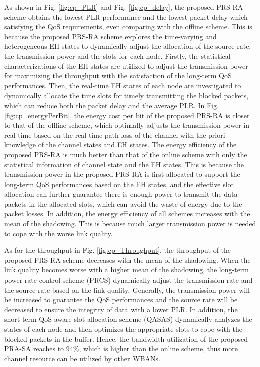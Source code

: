 \documentclass[journal,10pt]{IEEEtran}
\begin{document}
As shown in Fig. \ref{fig:cp_PLR} and Fig. \ref{fig:cp_delay}, the proposed PRS-RA scheme obtains the lowest PLR performance and the lowest packet delay which satisfying the QoS requirements, even comparing with the offline scheme. 
This is because the proposed PRS-RA scheme explores the time-varying and heterogeneous EH states to dynamically adjust the allocation of the source rate, the transmission power and the slots for each node. Firstly, the statistical characterizations of the EH states are utilized to adjust the transmission power for maximizing the throughput with the satisfaction of the long-term QoS performances. Then, the real-time EH states of each node are investigated to dynamically allocate the time slots for timely transmitting the blocked packets, which can reduce both the packet delay and the average PLR. In Fig. \ref{fig:cp_energyPerBit}, the energy cost per bit of the proposed PRS-RA is closer to that of the offline scheme, which optimally adjusts the transmission power in real-time based on the real-time path loss of the channel with the priori knowledge of the channel states and EH states. The energy efficiency of the proposed PRS-RA is much better than that of the online scheme with only the statistical information of channel state and the EH states. This is because the transmission power in the proposed PRS-RA is first allocated to support the long-term QoS performances based on the EH states, and the effective slot allocation can further guarantee there is enough power to transmit the data packets in the allocated slots, which can avoid the waste of energy due to the packet losses. In addition, the energy efficiency of all schemes increases with the mean of the shadowing. This is because much larger transmission power is needed to cope with the worse link quality.


As for the throughput in Fig. \ref{fig:cp_Throughput}, the throughput of the proposed PRS-RA scheme decreases with the mean of the shadowing. When the link quality becomes worse with a higher mean of the shadowing, the long-term power-rate control scheme (PRCS) dynamically adjust the transmission rate and the source rate based on the link quality. Generally, the transmission power will be increased to guarantee the QoS performances and the source rate will be decreased to ensure the integrity of data with a lower PLR. In addition, the short-term QoS aware slot allocation scheme (QASAS) dynamically analyzes the states of each node and then optimizes the appropriate slots to cope with the blocked packets in the buffer. Hence, the bandwidth utilization of the proposed PRA-SA reaches to 94\%, which is higher than the online scheme, thus more channel resource can be utilized by other WBANs.
\end{document}
